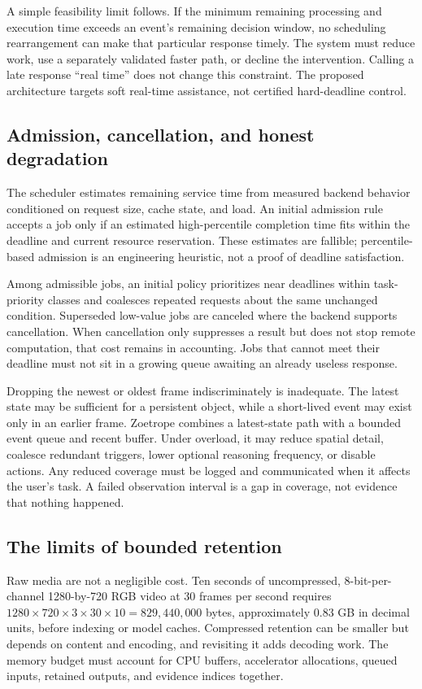 \documentclass[11pt,letterpaper]{article}
\begin{document}
A simple feasibility limit follows. If the minimum remaining processing and execution time exceeds an event's remaining decision window, no scheduling rearrangement can make that particular response timely. The system must reduce work, use a separately validated faster path, or decline the intervention. Calling a late response ``real time'' does not change this constraint. The proposed architecture targets soft real-time assistance, not certified hard-deadline control.

\subsection{Admission, cancellation, and honest degradation}
The scheduler estimates remaining service time from measured backend behavior conditioned on request size, cache state, and load. An initial admission rule accepts a job only if an estimated high-percentile completion time fits within the deadline and current resource reservation. These estimates are fallible; percentile-based admission is an engineering heuristic, not a proof of deadline satisfaction.

Among admissible jobs, an initial policy prioritizes near deadlines within task-priority classes and coalesces repeated requests about the same unchanged condition. Superseded low-value jobs are canceled where the backend supports cancellation. When cancellation only suppresses a result but does not stop remote computation, that cost remains in accounting. Jobs that cannot meet their deadline must not sit in a growing queue awaiting an already useless response.

Dropping the newest or oldest frame indiscriminately is inadequate. The latest state may be sufficient for a persistent object, while a short-lived event may exist only in an earlier frame. Zoetrope combines a latest-state path with a bounded event queue and recent buffer. Under overload, it may reduce spatial detail, coalesce redundant triggers, lower optional reasoning frequency, or disable actions. Any reduced coverage must be logged and communicated when it affects the user's task. A failed observation interval is a gap in coverage, not evidence that nothing happened.

\subsection{The limits of bounded retention}
Raw media are not a negligible cost. Ten seconds of uncompressed, 8-bit-per-channel 1280-by-720 RGB video at 30 frames per second requires $1280\times720\times3\times30\times10=829{,}440{,}000$ bytes, approximately 0.83 GB in decimal units, before indexing or model caches. Compressed retention can be smaller but depends on content and encoding, and revisiting it adds decoding work. The memory budget must account for CPU buffers, accelerator allocations, queued inputs, retained outputs, and evidence indices together.
\end{document}
